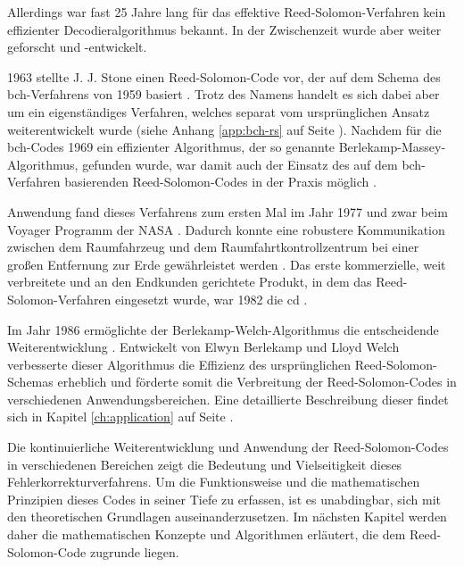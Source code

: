 Allerdings war fast 25 Jahre lang für das effektive Reed-Solomon-Verfahren kein effizienter Decodier\-algorithmus bekannt.
In der Zwischenzeit wurde aber weiter geforscht und -entwickelt.

1963 stellte J. J. Stone einen Reed-Solomon-Code vor, der auf dem Schema des \acrfull{bch}-Verfahrens von 1959 basiert \cite{stoneMultipleBurstErrorCorrection1963}.
Trotz des Namens handelt es sich dabei aber um ein eigenständiges Verfahren, welches separat vom ursprünglichen Ansatz weiterentwickelt wurde (siehe Anhang \ref{app:bch-rs} auf Seite \pageref{app:bch-rs}).
Nachdem für die \acrshort{bch}-Codes 1969 ein effizienter Algorithmus, der so genannte Berlekamp-Massey-Algorithmus, gefunden wurde, war damit auch der Einsatz des auf dem \acrshort{bch}-Verfahren basierenden Reed-Solomon-Codes in der Praxis möglich \cite{berlekampNonbinaryBCHDecoding1968, masseyShiftregisterSynthesisBCH1969}.

Anwendung fand dieses Verfahrens zum ersten Mal im Jahr 1977 und zwar beim Voyager Programm der NASA \cite[Kapitel 3.3]{wickerReedSolomonCodes1994}. 
Dadurch konnte eine robustere Kommunikation zwischen dem Raumfahrzeug und dem Raumfahrtkontrollzentrum bei einer großen Entfernung zur Erde gewährleistet werden \cite[Kapitel 6.2]{ludwigVoyagerTelecommunications2002}.
Das erste kommerzielle, weit verbreitete und an den Endkunden gerichtete Produkt, in dem das Reed-Solomon-Verfahren eingesetzt wurde, war 1982 die \acrfull{cd} \cite{changReedSolomonProductCodeRSPC1998}.

Im Jahr 1986 ermöglichte der Berlekamp-Welch-Algorithmus die entscheidende Weiterentwicklung \cite{wendlingIntroductionReedSolomon2017}.
Entwickelt von Elwyn Berlekamp und Lloyd Welch verbesserte dieser Algorithmus die Effizienz des ursprünglichen Reed-Solomon-Schemas erheblich und förderte somit die Verbreitung der Reed-Solomon-Codes in verschiedenen Anwendungsbereichen. 
Eine detaillierte Beschreibung dieser findet sich in Kapitel \ref{ch:application} auf Seite \pageref{ch:application}.

Die kontinuierliche Weiterentwicklung und Anwendung der Reed-Solomon-Codes in verschiedenen Bereichen zeigt die Bedeutung und Vielseitigkeit dieses Fehlerkorrekturverfahrens. 
Um die Funktionsweise und die mathematischen Prinzipien dieses Codes in seiner Tiefe zu erfassen, ist es unabdingbar, sich mit den theoretischen Grundlagen auseinanderzusetzen. 
Im nächsten Kapitel werden daher die mathematischen Konzepte und Algorithmen erläutert, die dem Reed-Solomon-Code zugrunde liegen.